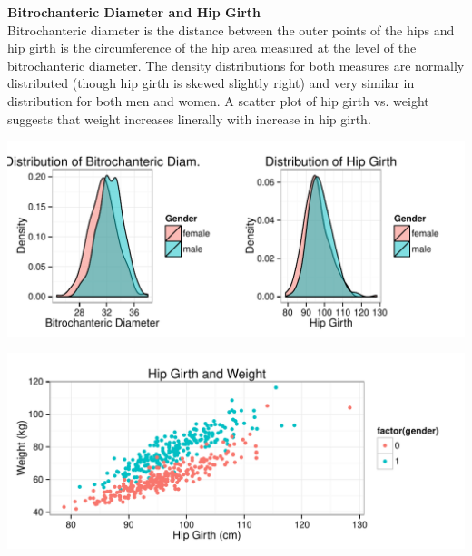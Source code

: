 \documentclass[11pt]{article}\usepackage[]{graphicx}\usepackage[]{color}
\makeatletter
\def\maxwidth{ %
  \ifdim\Gin@nat@width>\linewidth
    \linewidth
  \else
    \Gin@nat@width
  \fi
}
\newenvironment{knitrout}{}{} %
\makeatother
\begin{document}

\textbf{Bitrochanteric Diameter and Hip Girth}\\
 
Bitrochanteric diameter is the distance between the outer points of the hips and hip girth is the circumference of the hip area measured at the level of the bitrochanteric diameter. The density distributions for both measures are normally distributed (though hip girth is skewed slightly right) and very similar in distribution for both men and women. A scatter plot of hip girth vs. weight suggests that weight increases linerally with increase in hip girth.

\begin{knitrout}
\color{fgcolor}
\includegraphics[width=\maxwidth]{figure/hip_plots} 

\end{knitrout}



\begin{knitrout}
\color{fgcolor}
\includegraphics[width=\maxwidth]{figure/hipgirth_plot} 

\end{knitrout}


\end{document}
